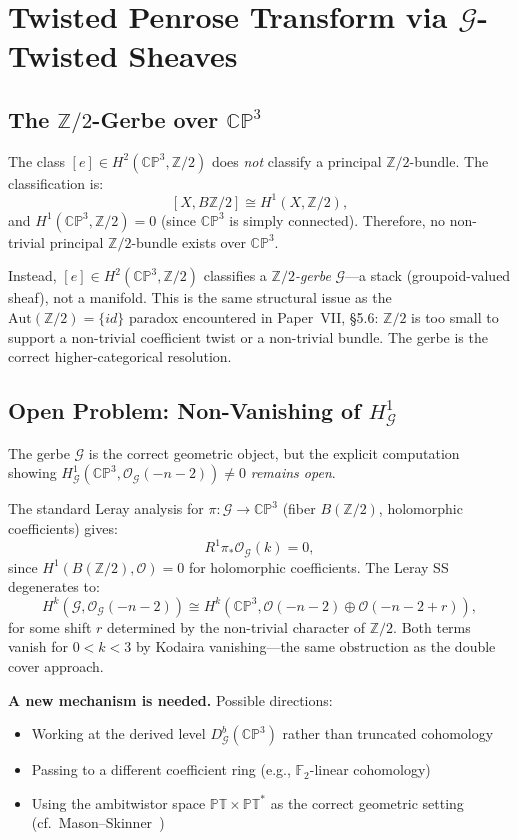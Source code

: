 \documentclass[11pt,a4paper]{article}
\theoremstyle{remark}
\newcommand{\PT}{\mathbb{PT}}
\newcommand{\CP}{\mathbb{CP}}
\newcommand{\Z}{\mathbb{Z}}
\newcommand{\cO}{\mathcal{O}}
\newcommand{\cG}{\mathcal{G}}
\begin{document}
\section{Twisted Penrose Transform via $\cG$-Twisted Sheaves}
\label{sec:twisted}

\subsection{The $\Z/2$-Gerbe over $\CP^3$}

The class $[e] \in H^2(\CP^3, \Z/2)$ does \emph{not} classify a principal
$\Z/2$-bundle. The classification is:
\[
[X, B\Z/2] \cong H^1(X, \Z/2),
\]
and $H^1(\CP^3, \Z/2) = 0$ (since $\CP^3$ is simply connected). Therefore,
no non-trivial principal $\Z/2$-bundle exists over $\CP^3$.

Instead, $[e] \in H^2(\CP^3, \Z/2)$ classifies a \emph{$\Z/2$-gerbe}
$\cG$---a stack (groupoid-valued sheaf), not a manifold. This is the same
structural issue as the $\text{Aut}(\Z/2) = \{id\}$ paradox encountered
in Paper~VII, \S5.6: $\Z/2$ is too small to support a non-trivial
coefficient twist or a non-trivial bundle. The gerbe is the correct
higher-categorical resolution.

\subsection{Open Problem: Non-Vanishing of $H^1_{\cG}$}
\label{sec:open-nonvanishing}

The gerbe $\cG$ is the correct geometric object, but the explicit
computation showing $H^1_{\cG}(\CP^3, \cO_{\cG}(-n-2)) \neq 0$
\emph{remains open}.

The standard Leray analysis for $\pi: \cG \to \CP^3$ (fiber $B(\Z/2)$,
holomorphic coefficients) gives:
\[
R^1 \pi_* \cO_{\cG}(k) = 0,
\]
since $H^1(B(\Z/2), \cO) = 0$ for holomorphic coefficients. The Leray SS
degenerates to:
\[
H^k(\cG, \cO_{\cG}(-n-2)) \cong
  H^k(\CP^3, \cO(-n-2) \oplus \cO(-n-2+r)),
\]
for some shift $r$ determined by the non-trivial character of $\Z/2$.
Both terms vanish for $0 < k < 3$ by Kodaira vanishing---the same
obstruction as the double cover approach.

\textbf{A new mechanism is needed.} Possible directions:
\begin{itemize}
  \item Working at the derived level $D^b_{\cG}(\CP^3)$ rather than
    truncated cohomology
  \item Passing to a different coefficient ring (e.g., $\mathbb{F}_2$-linear
    cohomology)
  \item Using the ambitwistor space $\PT \times \PT^*$ as the correct
    geometric setting (cf.\ Mason--Skinner~\cite{MasonSkinner2014})
\end{itemize}
\end{document}
